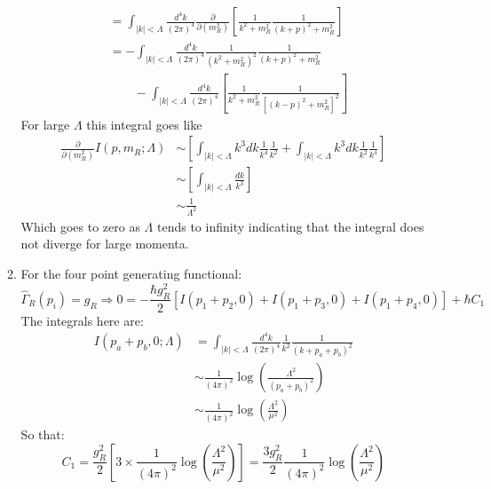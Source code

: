 \documentclass[12pt,a4]{article}
\begin{document}
\begin{enumerate}
\begin{enumerate}
\begin{align*}
                                                             &= \int_{|k| < \Lambda} \frac{d^4 k}{(2 \pi)^4} \frac{\partial}{\partial (m^2_R)}\left[\frac{1}{k^2 + m_R^2} \frac{1}{(k + p)^2 + m_R^2}\right]\\
                                                             &= - \int_{|k| < \Lambda} \frac{d^4 k}{(2 \pi)^4} \frac{1}{(k^2 + m_R^2)^2} \frac{1}{(k + p)^2 + m_R^2}\\
                                                             &  \qquad-\int_{|k| < \Lambda} \frac{d^4 k}{(2 \pi)^4} \left[\frac{1}{k^2 + m_R^2} \frac{1}{[(k - p)^2 + m_R^2]^2}\right]
        \end{align*}
        For large $\Lambda$ this integral goes like
        \begin{align*}
          \frac{\partial}{\partial (m^2_R)}I(p, m_R;\Lambda)  &\sim \left[\int_{|k| < \Lambda} k^3 d k \frac{1}{k^4} \frac{1}{k^2} + \int_{|k| < \Lambda} k^3d k \frac{1}{k^2} \frac{1}{k^4}\right]\\
                                                              &\sim \left[\int_{|k| < \Lambda} \frac{d k}{k^3}\right]\\
                                                              &\sim \frac{1}{\Lambda^2}
        \end{align*}
        Which goes to zero as $\Lambda$ tends to infinity indicating that the integral does not diverge for large momenta.
      \item
        For the four point generating functional:
        \begin{equation*}
          \hat \Gamma_R(p_i) = g_R \Rightarrow 0 = -\frac{\hbar g_R^2}{2}[I(p_1 + p_2, 0) + I(p_1 + p_3, 0) + I(p_1 + p_4, 0)] + \hbar C_1
        \end{equation*}
        The integrals here are:
        \begin{align*}
          I(p_a + p_b, 0;\Lambda) &= \int_{|k| < \Lambda} \frac{d^4 k}{(2 \pi)^4} \frac{1}{k^2 } \frac{1}{(k + p_a + p_b)^2 }\\
                                  &\sim \frac{1}{(4 \pi)^2} \log\left(\frac{\Lambda^2}{(p_a + p_b)^2}\right)\\
                                  &\sim \frac{1}{(4 \pi)^2} \log\left(\frac{\Lambda^2}{\mu^2}\right)
        \end{align*}
        So that:
        \begin{equation*}
          C_1 = \frac{ g_R^2}{2}\left[3 \times \frac{1}{(4 \pi)^2} \log\left(\frac{\Lambda^2}{\mu^2}\right)\right] = \frac{3g_R^2}{2}\frac{1}{(4 \pi)^2} \log\left(\frac{\Lambda^2}{\mu^2}\right)

\end{equation*}
\end{enumerate}
\end{enumerate}
\end{document}
